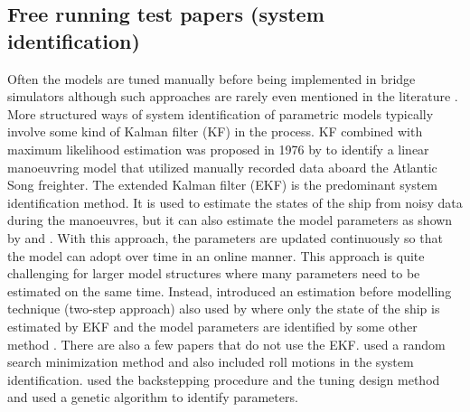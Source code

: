 \subsection{Free running test papers (system identification)} \label{sec:FT} %
Often the models are tuned manually before being implemented in bridge simulators although such approaches are rarely even mentioned in the literature \cite{sutuloAlgorithmOfflineIdentification2014}. More structured ways of system identification of parametric models typically involve some kind of Kalman filter (KF) in the process. KF combined with maximum likelihood estimation was proposed in 1976 by \textcite{astromIdentificationShipSteering1976} to identify a linear manoeuvring model that utilized manually recorded data aboard the Atlantic Song freighter. The extended Kalman filter (EKF) is the predominant system identification method. It is used to estimate the states of the ship from noisy data during the manoeuvres, but it can also estimate the model parameters as shown by \textcite{shiIdentificationShipManoeuvring2009} and \textcite{pereraSystemIdentificationNonlinear2015}. With this approach, the parameters are updated continuously so that the model can adopt over time in an online manner. This approach is quite challenging for larger model structures where many parameters need to be estimated on the same time. Instead, \textcite{yoonIdentificationHydrodynamicCoefficients2003} introduced an estimation before modelling technique  (two-step approach) also used by \textcite{revestidoherreroTwostepIdentificationNonlinear2012} where only the state of the ship is estimated by EKF and the model parameters are identified by some other method .  
There are also a few papers that do not use the EKF. \textcite{tianoMultivariableIdentificationShip1997} used a random search minimization method and also included roll motions in the system identification. \textcite{casadoIdentificationNonlinearShip2005} used the backstepping procedure and the tuning design method and \textcite{millerShipModelIdentification2021} used a genetic algorithm to identify parameters.

